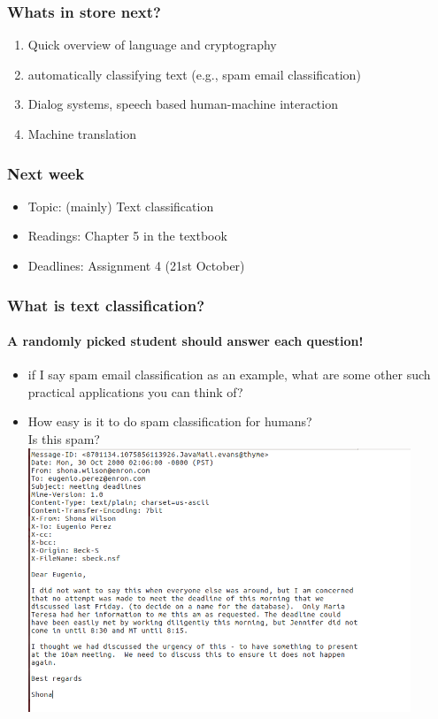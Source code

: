 \documentclass{beamer}
\begin{document}
\begin{frame}
\frametitle{Whats in store next?}
\begin{enumerate}
\item Quick overview of language and cryptography 
\item automatically classifying text (e.g., spam email classification)
\item Dialog systems, speech based human-machine interaction
\item Machine translation
\end{enumerate}
\end{frame}

\begin{frame}%
\frametitle{Next week}
\begin{itemize}
\item Topic: (mainly) Text classification
\item Readings: Chapter 5 in the textbook
\item Deadlines: Assignment 4 (21st October)
\end{itemize}
\end{frame}

\begin{frame}%
\frametitle{What is text classification?}
\framesubtitle{A randomly picked student should answer each question!}
\begin{itemize}
\item if I say spam email classification as an example, what are some other such practical applications you can think of? \pause
\item How easy is it to do spam classification for humans? \pause 
\\ Is this spam?
\\ \includegraphics[width=0.9\textwidth]{ham.png}
\end{itemize}
\end{frame}
\end{document}
